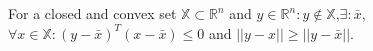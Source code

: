 For a closed and convex set $\mathbb{X} \subset \mathbb{R}^n$ and $y \in \mathbb{R}^n : y \notin \mathbb{X}$,$\exists : \bar{x}$, $\forall x \in \mathbb{X} : (y - \bar{x})^T (x - \bar{x}) \leq 0$ and $|| y - x || \geq || y - \bar{x} ||$.
